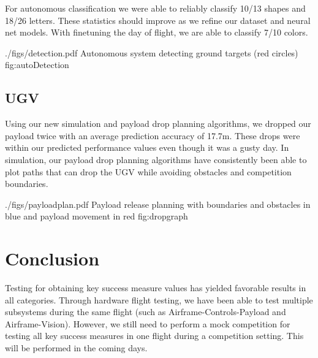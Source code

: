 \documentclass[]{auvsi_doc}
\begin{document}
For autonomous classification we were able to reliably classify 10/13 shapes and 18/26 letters. These statistics should improve as we refine our dataset and neural net models. With finetuning the day of flight, we are able to classify 7/10 colors.

\AUVSIFigure
{./figs/detection.pdf}
{\textwidth}
{Autonomous system detecting ground targets (red circles)}
{fig:autoDetection}

\subsection{UGV}

Using our new simulation and payload drop planning algorithms, we dropped our payload twice with an average
prediction accuracy of 17.7m. These drops were within our predicted performance values even though it was
a gusty day. In simulation, our payload drop planning algorithms have consistently been able to plot paths
that can drop the UGV while avoiding obstacles and competition boundaries.

\AUVSIFigure
{./figs/payloadplan.pdf}
{\textwidth}
{Payload release planning with boundaries and obstacles in blue and payload movement in red}
{fig:dropgraph}

\section{Conclusion}

Testing for obtaining key success measure values has yielded favorable results in all categories. Through hardware flight testing, we have been able to test multiple subsystems during the same flight (such as Airframe-Controls-Payload and Airframe-Vision). However, we still need to perform a mock competition for testing all key success measures in one flight during a competition setting. This will be performed in the coming days.
\end{document}
